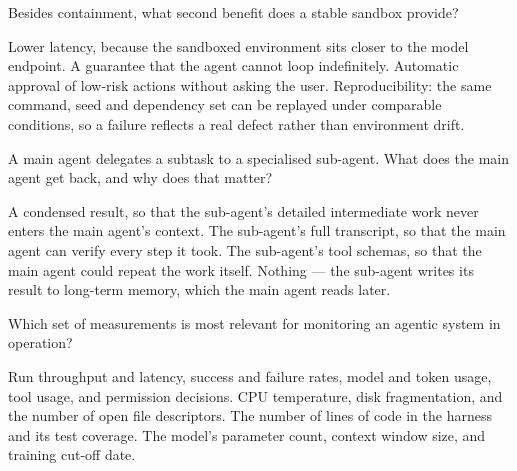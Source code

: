 \begin{questions}
\qitem Besides containment, what second benefit does a stable sandbox provide?
\begin{choices}
  \choice Lower latency, because the sandboxed environment sits closer to the model endpoint.
  \choice A guarantee that the agent cannot loop indefinitely.
  \choice Automatic approval of low-risk actions without asking the user.
  \CorrectChoice Reproducibility: the same command, seed and dependency set can be replayed under comparable conditions, so a failure reflects a real defect rather than environment drift.
\end{choices}
\dontknow
{}

\qitem A main agent delegates a subtask to a specialised sub-agent. What does the main agent get back,
and why does that matter?
\begin{choices}
  \CorrectChoice A condensed result, so that the sub-agent's detailed intermediate work never enters the main agent's context.
  \choice The sub-agent's full transcript, so that the main agent can verify every step it took.
  \choice The sub-agent's tool schemas, so that the main agent could repeat the work itself.
  \choice Nothing --- the sub-agent writes its result to long-term memory, which the main agent reads later.
\end{choices}
\dontknow
{}


\qitem Which set of measurements is most relevant for monitoring an agentic system in operation?
\begin{choices}
  \CorrectChoice Run throughput and latency, success and failure rates, model and token usage, tool usage, and permission decisions.
  \choice CPU temperature, disk fragmentation, and the number of open file descriptors.
  \choice The number of lines of code in the harness and its test coverage.
  \choice The model's parameter count, context window size, and training cut-off date.
\end{choices}
\dontknow
{}


\end{questions}
